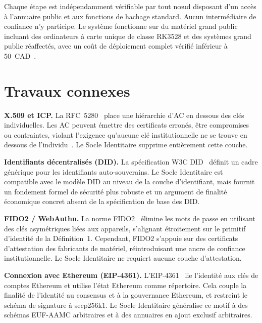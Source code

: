 \documentclass[11pt,a4paper]{article}
\begin{document}
Chaque étape est indépendamment vérifiable par tout n\oe{}ud disposant d'un
accès à l'annuaire public et aux fonctions de hachage standard.  Aucun
intermédiaire de confiance n'y participe.  Le système fonctionne sur du
matériel grand public incluant des ordinateurs à carte unique de classe
RK3528 et des systèmes grand public réaffectés, avec un coût de déploiement
complet vérifié inférieur à 50~CAD~\cite{onchain}.

\section{Travaux connexes}
\label{sec:connexes}

\textbf{X.509 et ICP.}  La RFC~5280~\cite{rfc5280} place une hiérarchie
d'AC en dessous des clés individuelles.  Les AC peuvent émettre des
certificats erronés, être compromises ou contraintes, violant l'exigence
qu'aucune clé institutionnelle ne se trouve en dessous de
l'individu~\cite{goldreich2001}.  Le Socle Identitaire supprime entièrement
cette couche.

\textbf{Identifiants décentralisés (DID).}  La spécification W3C
DID~\cite{did2022} définit un cadre générique pour les identifiants
auto-souverains.  Le Socle Identitaire est compatible avec le modèle DID au
niveau de la couche d'identifiant, mais fournit un fondement formel de
sécurité plus robuste et un argument de finalité économique concret absent de
la spécification de base des DID.

\textbf{FIDO2 / WebAuthn.}  La norme FIDO2~\cite{webauthn2021} élimine les
mots de passe en utilisant des clés asymétriques liées aux appareils, s'alignant
étroitement sur le primitif d'identité de la Définition~1.  Cependant,
FIDO2 s'appuie sur des certificats d'attestation des fabricants de matériel,
réintroduisant une ancre de confiance institutionnelle.  Le Socle Identitaire
ne requiert aucune couche d'attestation.

\textbf{Connexion avec Ethereum (EIP-4361).}  L'EIP-4361~\cite{eip4361} lie
l'identité aux clés de comptes Ethereum et utilise l'état Ethereum comme
répertoire.  Cela couple la finalité de l'identité au consensus et à la
gouvernance Ethereum, et restreint le schéma de signature à secp256k1.  Le
Socle Identitaire généralise ce motif à des schémas EUF-AAMC arbitraires et
à des annuaires en ajout exclusif arbitraires.
\end{document}
